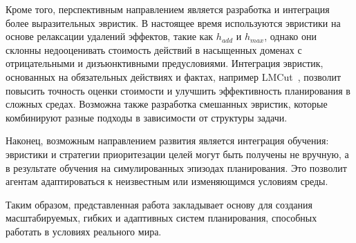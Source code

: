 Кроме того, перспективным направлением является разработка
и интеграция более выразительных эвристик.
В настоящее время используются эвристики на основе релаксации удалений эффектов,
такие как $h_{add}$ и $h_{max}$,
однако они склонны недооценивать стоимость действий
в насыщенных доменах с отрицательными и дизъюнктивными предусловиями.
Интеграция эвристик, основанных на обязательных действиях и фактах,
например LMCut~\cite{lmcut},
позволит повысить точность оценки стоимости
и улучшить эффективность планирования в сложных средах.
Возможна также разработка смешанных эвристик,
которые комбинируют разные подходы в зависимости от структуры задачи.

Наконец, возможным направлением развития является интеграция обучения:
эвристики и стратегии приоритезации целей могут быть получены
не вручную, а в результате обучения на симулированных эпизодах планирования.
Это позволит агентам адаптироваться к неизвестным или изменяющимся условиям среды.

Таким образом, представленная работа закладывает основу
для создания масштабируемых, гибких и адаптивных систем планирования,
способных работать в условиях реального мира.
